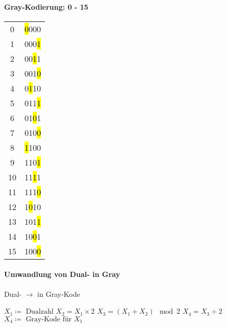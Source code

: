 \documentclass[a4paper]{scrartcl}
\begin{document}
					\paragraph{Gray-Kodierung: 0 - 15}
					\begin{table}
						\centering
						\begin{tabular}{c|c}
							0&\hl{0}000\\
							1&000\hl{1}\\
							2&00\hl{1}1\\
							3&001\hl{0}\\
							4&0\hl{1}10\\
							5&011\hl{1}\\
							6&01\hl{0}1\\
							7&010\hl{0}\\
							8&\hl{1}100\\
							9&110\hl{1}\\
							10&11\hl{1}1\\
							11&111\hl{0}\\
							12&1\hl{0}10\\
							13&101\hl{1}\\
							14&10\hl{0}1\\
							15&100\hl{0}\\
						\end{tabular}
					\end{table}
					
					\paragraph{Umwandlung von Dual- in Gray}
					\begin{algorithm}[H]
						\caption{Dual- \( \rightarrow \) in Gray-Kode }
						\DontPrintSemicolon
						
						\( X_1 \coloneqq \text{ Dualzahl} \)\; 
						\BlankLine
						\( X_2 = X_1 \times 2 \)  
						\( X_3 = (X_1 + X_2) \mod 2 \) 
						\( X_4 = X_3 \div 2 \) 
						\BlankLine
						\( X_4 \coloneqq \text{ Gray-Kode für } X_1\) \;
					\end{algorithm}
					
\end{document}
